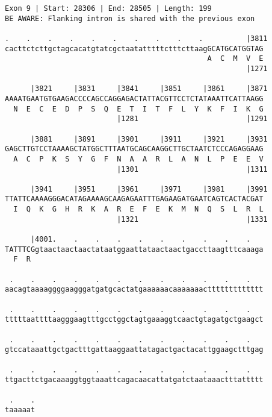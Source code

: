 \documentclass{article}
\begin{document}
\begin{Verbatim}[fontfamily=courier]
Exon 9 | Start: 28306 | End: 28505 | Length: 199
BE AWARE: Flanking intron is shared with the previous exon

.    .    .    .    .    .    .    .    .    .          |3811
cacttctcttgctagcacatgtatcgctaatatttttctttcttaagGCATGCATGGTAG
                                               A  C  M  V  E
                                                        |1271

      |3821     |3831     |3841     |3851     |3861     |3871
AAAATGAATGTGAAGACCCCAGCCAGGAGACTATTACGTTCCTCTATAAATTCATTAAGG
  N  E  C  E  D  P  S  Q  E  T  I  T  F  L  Y  K  F  I  K  G
                          |1281                         |1291

      |3881     |3891     |3901     |3911     |3921     |3931
GAGCTTGTCCTAAAAGCTATGGCTTTAATGCAGCAAGGCTTGCTAATCTCCCAGAGGAAG
  A  C  P  K  S  Y  G  F  N  A  A  R  L  A  N  L  P  E  E  V
                          |1301                         |1311

      |3941     |3951     |3961     |3971     |3981     |3991
TTATTCAAAAGGGACATAGAAAAGCAAGAGAATTTGAGAAGATGAATCAGTCACTACGAT
  I  Q  K  G  H  R  K  A  R  E  F  E  K  M  N  Q  S  L  R  L
                          |1321                         |1331

      |4001.    .    .    .    .    .    .    .    .    .   
TATTTCGgtaactaactaactataatggaattataactaactgaccttaagtttcaaaga
  F  R                                                      

 .    .    .    .    .    .    .    .    .    .    .    .   
aacagtaaaaggggaagggatgatgcactatgaaaaaacaaaaaaacttttttttttttt

 .    .    .    .    .    .    .    .    .    .    .    .   
tttttaattttaagggaagtttgcctggctagtgaaaggtcaactgtagatgctgaagct

 .    .    .    .    .    .    .    .    .    .    .    .   
gtccataaattgctgactttgattaaggaattatagactgactacattggaagctttgag

 .    .    .    .    .    .    .    .    .    .    .    .   
ttgacttctgacaaaggtggtaaattcagacaacattatgatctaataaactttattttt

 .    .
taaaaat
\end{Verbatim}
\newpage
\end{document}

